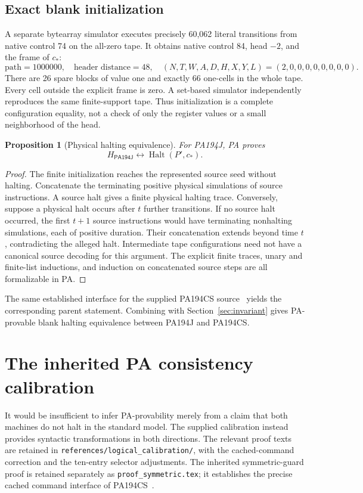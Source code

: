 \documentclass[11pt,letterpaper]{article}
\newcommand{\Halt}{\operatorname{Halt}}
\newcommand{\file}[1]{\texttt{\nolinkurl{#1}}}
\newcommand{\M}{\mathsf{PA194J}}
\newtheorem{proposition}[theorem]{Proposition}
\begin{document}
\subsection{Exact blank initialization}

A separate bytearray simulator executes precisely 60,062 literal
transitions from native control 74 on the all-zero tape. It obtains
native control 84, head \(-2\), and the frame of \(c_*\):
\[
 \text{path}=1000000,\quad\text{header distance}=48,\quad
 (N,T,W,A,D,H,X,Y,L)=(2,0,0,0,0,0,0,0,0).
\]
There are 26 spare blocks of value one and exactly 66 one-cells in the
whole tape. Every cell outside the explicit frame is zero. A set-based
simulator independently reproduces the same finite-support tape.
Thus initialization is a complete configuration equality, not a check of
only the register values or a small neighborhood of the head.

\begin{proposition}[Physical halting equivalence]
For PA194J, PA proves
\[
 H_\M\leftrightarrow\Halt(P',c_*).
\]
\end{proposition}
\begin{proof}
The finite initialization reaches the represented source seed without
halting. Concatenate the terminating positive physical simulations of
source instructions. A source halt gives a finite physical halting trace.
Conversely, suppose a physical halt occurs after \(t\) further transitions.
If no source halt occurred, the first \(t+1\) source instructions would
have terminating nonhalting simulations, each of positive duration.
Their concatenation extends beyond time \(t\), contradicting the alleged
halt. Intermediate tape configurations need not have a canonical source
decoding for this argument. The explicit finite traces, unary and
finite-list inductions, and induction on concatenated source steps are
all formalizable in PA.
\end{proof}

The same established interface for the supplied PA194CS source~\cite{cached} yields
the corresponding parent statement. Combining with
Section~\ref{sec:invariant} gives PA-provable blank halting equivalence
between PA194J and PA194CS.

\section{The inherited PA consistency calibration}
\label{sec:calibration}

It would be insufficient to infer PA-provability merely from a claim
that both machines do not halt in the standard model. The supplied
calibration instead provides syntactic transformations in both
directions. The relevant proof texts are retained in
\file{references/logical_calibration/}, with the cached-command correction
and the ten-entry selector adjustments. The inherited symmetric-guard
proof is retained separately as \file{proof_symmetric.tex}; it establishes
the precise cached command interface of PA194CS~\cite{cached}.
\end{document}

